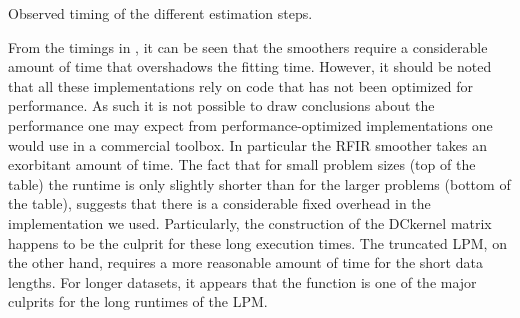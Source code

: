 \begin{table}
  \centering
  \centering
  \caption{Observed timing of the different estimation steps.}
% 
\label{tbl:init:timing}
\end{table}

From the timings in , it can be seen that the smoothers require a considerable amount of time that overshadows the fitting time.
However, it should be noted that all these implementations rely on code that has not been optimized for performance.
As such it is not possible to draw conclusions about the performance one may expect from performance-optimized implementations one would use in a commercial toolbox.
In particular the \gls{RFIR} smoother takes an exorbitant amount of time.
The fact that for small problem sizes (top of the table) the runtime is only slightly shorter than for the larger problems (bottom of the table), suggests that there is a considerable fixed overhead in the implementation we used.
Particularly, the construction of the \gls{DCkernel} matrix happens to be the culprit for these long execution times.
The truncated \gls{LPM}, on the other hand, requires a more reasonable amount of time for the short data lengths.
For longer datasets, it appears that the  function is one of the major culprits for the long runtimes of the \gls{LPM}.

